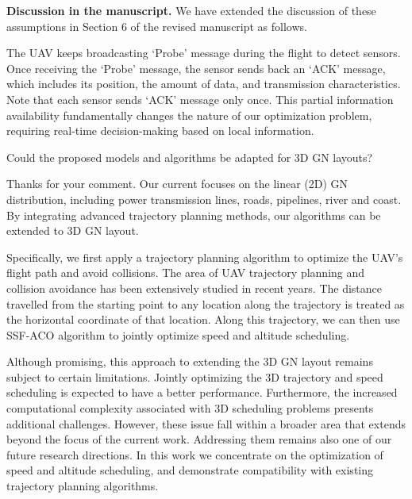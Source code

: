 \begin{revresponse}
	\textbf{Discussion in the manuscript.}
	We have extended the discussion of these assumptions in Section 6 of the revised manuscript as follows.
	\begin{changes}
		The UAV keeps broadcasting `Probe' message during the flight to detect sensors. Once receiving the `Probe' message, the sensor sends back an `ACK' message, which includes its position, the amount of data, and transmission characteristics. Note that each sensor sends `ACK' message only once. This partial information availability fundamentally changes the nature of our optimization problem, requiring real-time 
		decision-making based on local information.
	\end{changes}
\end{revresponse}

\begin{revcomment}
	Could the proposed models and algorithms be adapted for 3D GN layouts?
\end{revcomment}
\begin{revresponse}
	Thanks for your comment.
	Our current focuses on the linear (2D) GN distribution, including power transmission lines, roads, pipelines, river and coast. By integrating advanced trajectory planning methods, our algorithms can be extended to 3D GN layout.

	Specifically, we first apply a trajectory planning algorithm to optimize the UAV's flight path and avoid collisions.
	The area of UAV trajectory planning and collision avoidance has been extensively studied in recent years.
	The distance travelled from the starting point to any location along the trajectory is treated as the horizontal coordinate of that location.
	Along this trajectory, we can then use SSF-ACO algorithm to jointly optimize speed and altitude scheduling.
	
	Although promising, this approach to extending the 3D GN layout remains subject to certain limitations.
	Jointly optimizing the 3D trajectory and speed scheduling is expected to have a better performance.
	Furthermore, the increased computational complexity associated with 3D scheduling problems presents additional challenges.
	However, these issue fall within a broader area that extends beyond the focus of the current work.
	Addressing them remains also one of our future research directions.
	In this work we concentrate on the optimization of speed and altitude scheduling, and demonstrate compatibility with existing trajectory planning algorithms.
\end{revresponse}

